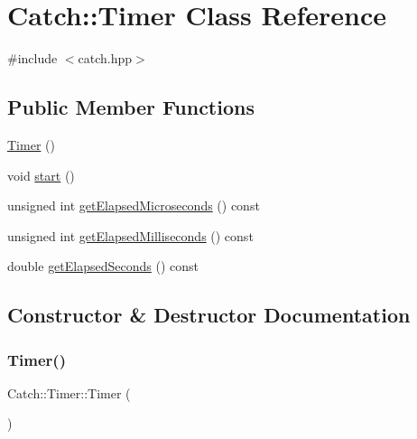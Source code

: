\hypertarget{class_catch_1_1_timer}{}\section{Catch\+:\+:Timer Class Reference}
\label{class_catch_1_1_timer}


{\ttfamily \#include $<$catch.\+hpp$>$}

\subsection*{Public Member Functions}
\begin{DoxyCompactItemize}
\item 
\mbox{\hyperlink{class_catch_1_1_timer_af09b7cd7a40af71f4704262afb31558a}{Timer}} ()
\item 
void \mbox{\hyperlink{class_catch_1_1_timer_a0a56e879e43f36c102bf9ea8b5fc8b72}{start}} ()
\item 
unsigned int \mbox{\hyperlink{class_catch_1_1_timer_af592ca4a9d340b9855732e4af777eaf0}{get\+Elapsed\+Microseconds}} () const
\item 
unsigned int \mbox{\hyperlink{class_catch_1_1_timer_a2081b2d36950ab6912e7c4958afe0099}{get\+Elapsed\+Milliseconds}} () const
\item 
double \mbox{\hyperlink{class_catch_1_1_timer_ae1615c8a9aa44b7a96cfe8a35d34e5de}{get\+Elapsed\+Seconds}} () const
\end{DoxyCompactItemize}


\subsection{Constructor \& Destructor Documentation}
\mbox{\label{class_catch_1_1_timer_af09b7cd7a40af71f4704262afb31558a}} 
\subsubsection{\texorpdfstring{Timer()}{Timer()}}
{\footnotesize\ttfamily Catch\+::\+Timer\+::\+Timer (\begin{DoxyParamCaption}{ }\end{DoxyParamCaption})\hspace{0.3cm}{\ttfamily [inline]}}



